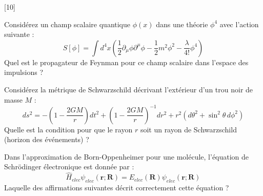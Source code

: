 
[10]



\question Considérez un champ scalaire quantique \(\phi(x)\) dans une théorie \(\phi^4\) avec l'action suivante :
\[ S[\phi] = \int d^4x \left( \frac{1}{2} \partial_\mu \phi \partial^\mu \phi - \frac{1}{2} m^2 \phi^2 - \frac{\lambda}{4!} \phi^4 \right) \]
Quel est le propagateur de Feynman pour ce champ scalaire dans l'espace des impulsions ?

\question Considérez la métrique de Schwarzschild décrivant l'extérieur d'un trou noir de masse \(M\) :
\[ ds^2 = -\left(1 - \frac{2GM}{r}\right)dt^2 + \left(1 - \frac{2GM}{r}\right)^{-1}dr^2 + r^2(d\theta^2 + \sin^2\theta \, d\phi^2) \]
Quelle est la condition pour que le rayon \(r\) soit un rayon de Schwarzschild (horizon des événements) ?

\question Dans l'approximation de Born-Oppenheimer pour une molécule, l'équation de Schrödinger électronique est donnée par :
\[ \hat{H}_{elec} \psi_{elec}(\mathbf{r}; \mathbf{R}) = E_{elec}(\mathbf{R}) \psi_{elec}(\mathbf{r}; \mathbf{R}) \]
Laquelle des affirmations suivantes décrit correctement cette équation ?
